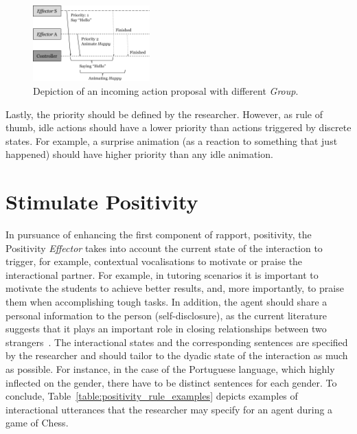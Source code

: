 \begin{figure}[H]
    \centering
    \includegraphics[width=0.4\textwidth]{images/NoConflicts.png}
    \caption{Depiction of an incoming action proposal with different \textit{Group}.}
    \label{fig:no_conflicts}
\end{figure}


Lastly, the priority should be defined by the researcher. However, as rule of thumb, idle actions should have a lower priority than actions triggered by discrete states. For example, a surprise animation (as a reaction to something that just happened) should have higher priority than any idle animation.

\section{Stimulate Positivity}
\label{sub:model_positivity}

In pursuance of enhancing the first component of rapport, positivity, the Positivity \textit{Effector} takes into account the current state of the interaction to trigger, for example, contextual vocalisations to motivate or praise the interactional partner. For example, in tutoring scenarios it is important to motivate the students to achieve better results, and, more importantly, to praise them when accomplishing tough tasks. In addition, the agent should share a personal information to the person (self-disclosure), as the current literature suggests that it plays an important role in closing relationships between two strangers~\cite{Kang2011}. The interactional states and the corresponding sentences are specified by the researcher and should tailor to the dyadic state of the interaction as much as possible. For instance, in the case of the Portuguese language, which highly inflected on the gender, there have to be distinct sentences for each gender. To conclude, Table~\ref{table:positivity_rule_examples} depicts examples of interactional utterances that the researcher may specify for an agent during a game of Chess.

